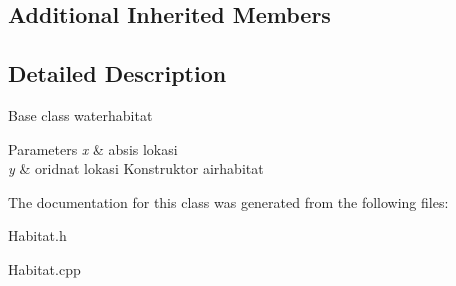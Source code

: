 \subsection*{Additional Inherited Members}


\subsection{Detailed Description}
Base class waterhabitat


\begin{DoxyParams}{Parameters}
{\em x} & absis lokasi \\
\hline
{\em y} & oridnat lokasi Konstruktor airhabitat \\
\hline
\end{DoxyParams}


The documentation for this class was generated from the following files\+:\begin{DoxyCompactItemize}
\item 
Habitat.\+h\item 
Habitat.\+cpp\end{DoxyCompactItemize}
